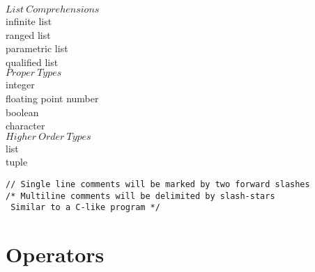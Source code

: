 \documentclass[5pt]{article}
\begin{document}
\begin{multicols}{2}
\noindent $List \ Comprehensions$ \\
infinite list \\
ranged list \\
parametric list \\
qualified list \\

\noindent $Proper \ Types$ \\
integer \\
floating point number \\
boolean \\
character \\

\noindent $Higher \ Order \ Types$ \\
list \\
tuple \\
\end{multicols}

\noindent \texttt{// Single line comments will be marked by two forward slashes} \\

\noindent \texttt{/* Multiline comments will be delimited by slash-stars} \\
\texttt{ \hspace*{3mm} Similar to a C-like program */} \\

\newpage 

\section{Operators}
\end{document}
